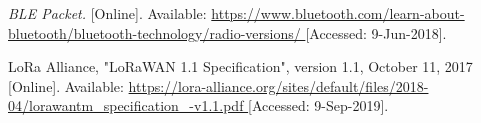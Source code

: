 \begin{thebibliography}{9}








\textit{
BLE Packet.
}
[Online]. Available:
\url{
https://www.bluetooth.com/learn-about-bluetooth/bluetooth-technology/radio-versions/
}
[Accessed: 9-Jun-2018].






LoRa Alliance, "LoRaWAN 1.1 Specification", version 1.1, October 11, 2017
[Online]. Available:
\url{
https://lora-alliance.org/sites/default/files/2018-04/lorawantm_specification_-v1.1.pdf
}
[Accessed: 9-Sep-2019].





\end{thebibliography}

